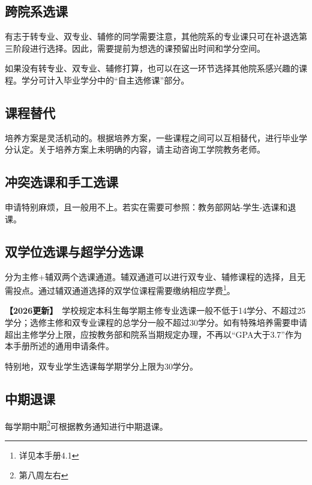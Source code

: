 \documentclass[11pt,oneside]{book}
\newcommand{\updateMark}{\textcolor{chaph}{\textbf{【2026更新】}}\ }
\begin{document}
\subsection{跨院系选课}
有志于转专业、双专业、辅修的同学需要注意，其他院系的专业课只可在补退选第三阶段进行选择。因此，需要提前为想选的课预留出时间和学分空间。

\vspace{10pt}

如果没有转专业、双专业、辅修打算，也可以在这一环节选择其他院系感兴趣的课程。学分可计入毕业学分中的“自主选修课”部分。

\subsection{课程替代}
培养方案是灵活机动的。根据培养方案，一些课程之间可以互相替代，进行毕业学分认定。关于培养方案上未明确的内容，请主动咨询工学院教务老师。

\subsection{冲突选课和手工选课}
申请特别麻烦，且一般用不上。若实在需要可参照：教务部网站-学生-选课和退课。

\subsection{双学位选课与超学分选课}
分为主修+辅双两个选课通道。辅双通道可以进行双专业、辅修课程的选择，且无需投点。通过辅双通道选择的双学位课程需要缴纳相应学费\footnote{详见本手册4.1}。

\vspace{10pt}

\updateMark 学校规定本科生每学期主修专业选课一般不低于14学分、不超过25学分；选修主修和双专业课程的总学分一般不超过30学分。如有特殊培养需要申请超出主修学分上限，应按教务部和院系当期规定办理，不再以“GPA大于3.7”作为本手册所述的通用申请条件。

\vspace{10pt}

特别地，双专业学生选课每学期学分上限为30学分。

\subsection{中期退课}
每学期中期\footnote{第八周左右}可根据教务通知进行中期退课。

\vspace{10pt}
\end{document}
